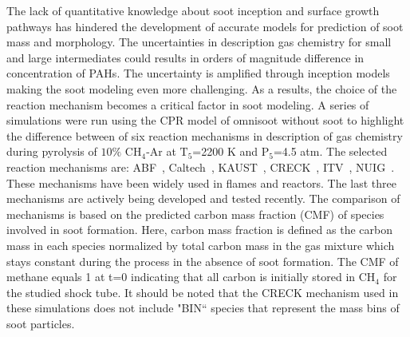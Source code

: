 The lack of quantitative knowledge about soot inception and surface growth pathways has hindered the development of accurate models for prediction of soot mass and morphology. The uncertainties in description gas chemistry for small and large intermediates could results in orders of magnitude difference in concentration of PAHs. The uncertainty is amplified through inception models making the soot modeling even more challenging. As a results, the choice of the reaction mechanism becomes a critical factor in soot modeling. A series of simulations were run using the CPR model of omnisoot without soot to highlight the difference between of six reaction mechanisms in description of gas chemistry during pyrolysis of $10\%$ $\mathrm{CH_4}$-Ar at $\mathrm{T_5}$=2200 K and $\mathrm{P_5}$=4.5 atm. The selected reaction mechanisms are: ABF~\citep{appel2000kinetic}, Caltech~\citep{blanquart2009chemical}, KAUST~\citep{wang2013pah}, CRECK~\citep{saggese2015kinetic}, ITV~\citep{hellmuth2024role}, NUIG~\citep{zhu2023wide}. These mechanisms have been widely used in flames and reactors. The last three mechanisms are actively being developed and tested recently. The comparison of mechanisms is based on the predicted carbon mass fraction (CMF) of species involved in soot formation. Here, carbon mass fraction is defined as the carbon mass in each species normalized by total carbon mass in the gas mixture which stays constant during the process in the absence of soot formation. The CMF of methane equals 1 at t=0 indicating that all carbon is initially stored in $\mathrm{CH_4}$ for the studied shock tube. It should be noted that the CRECK mechanism used in these simulations does not include "{BIN}`` species that represent the mass bins of soot particles.

